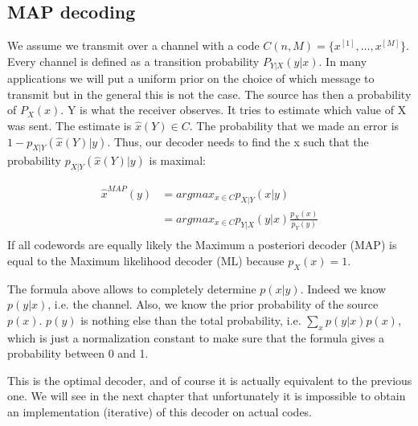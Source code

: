 \subsection{MAP decoding}
We assume we transmit over a channel with a code $C(n,M) = \{x^{[1]}, \dots, x^{[M]}\}$. Every channel is defined as a transition probability $P_{Y|X}(y|x)$. In many applications we will put a uniform prior on the choice of which message to transmit but in the general this is not the case. The source has then a probability of $P_X(x)$. Y is what the receiver observes. It tries to estimate which value of X was sent. The estimate is $\hat{x}(Y) \in C$. The probability that we made an error is $1-p_{X|Y}(\hat{x}(Y)|y)$. Thus, our decoder needs to find the x such that the probability $p_{X|Y}(\hat{x}(Y)|y)$ is maximal:

\begin{equation}
\begin{split}
\hat{x}^{MAP}(y) &= argmax_{x \in C}p_{X|Y}(x|y) \\
&= argmax_{x \in C}p_{Y|X}(y|x)\frac{p_X(x)}{p_Y(y)} \\
\end{split}
\end{equation}
If all codewords are equally likely the Maximum a posteriori decoder (MAP) is equal to the Maximum likelihood decoder (ML) because $p_X(x)=1$.

The formula above allows to completely determine $p(x|y)$. Indeed we know $p(y|x)$, i.e. the channel. Also, we know the prior probability of the source $p(x)$. $p(y)$ is nothing else than the total probability, i.e. $\sum_x p(y|x)p(x)$, which is just a normalization constant to make sure that the formula gives a probability between 0 and 1. 

This is the optimal decoder, and of course it is actually equivalent to the previous one. We will see in the next chapter that unfortunately it is impossible to obtain an implementation (iterative) of this decoder on actual codes. 

